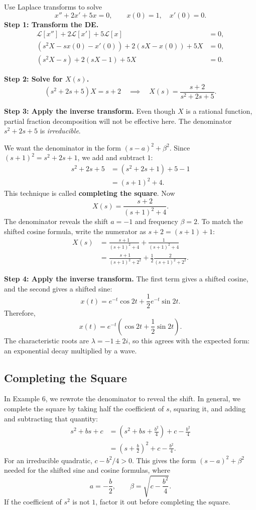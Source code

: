 \documentclass[10pt,letterpaper]{article}
\begin{document}
\begin{example}[6]{
Use Laplace transforms to solve
\[
x''+2x'+5x=0,\qquad x(0)=1,\quad x'(0)=0.
\]
}
\textbf{Step 1: Transform the DE.}
\begin{align*}
\mathcal{L}[x'']+2\mathcal{L}[x']+5\mathcal{L}[x]&=0,\\
(s^2X-sx(0)-x'(0))+2(sX-x(0))+5X&=0,\\
(s^2X-s)+2(sX-1)+5X&=0.
\end{align*}

\textbf{Step 2: Solve for $X(s)$.}
\[
(s^2+2s+5)X=s+2
\quad\implies\quad
X(s)=\frac{s+2}{s^2+2s+5}.
\]

\textbf{Step 3: Apply the inverse transform.}
Even though $X$ is a rational function, partial fraction decomposition will not be effective here. The denominator $s^2+2s+5$ is \textit{irreducible}. 

We want the denominator in the form $(s-a)^2+\beta^2$.
Since $(s+1)^2=s^2+2s+1$, we add and subtract $1$:
\begin{align*}
s^2+2s+5
&=(s^2+2s+1)+5-1\\
&=(s+1)^2+4.
\end{align*}
This technique is called \textbf{completing the square}.
Now
\[
X(s)=\frac{s+2}{(s+1)^2+4}.
\]
The denominator reveals the shift $a=-1$ and frequency
$\beta=2$. To match the shifted cosine formula,
write the numerator as $s+2=(s+1)+1$:
\begin{align*}
X(s)
&=\frac{s+1}{(s+1)^2+4}
+\frac{1}{(s+1)^2+4}\\
&=\frac{s+1}{(s+1)^2+2^2}
+\frac12\frac{2}{(s+1)^2+2^2}.
\end{align*}

\textbf{Step 4: Apply the inverse transform.}
The first term gives a shifted cosine, and the second
gives a shifted sine:
\[
x(t)=e^{-t}\cos2t+\frac12e^{-t}\sin2t.
\]
Therefore,
\[
\boxed{
x(t)=e^{-t}\left(\cos2t+\frac12\sin2t\right).
}
\]
The characteristic roots are $\lambda=-1\pm2i$,
so this agrees with the expected form:
an exponential decay multiplied by a wave.
\end{example}


\subsection{Completing the Square}

In Example 6, we rewrote the denominator to reveal
the shift. In general, we complete the square by
taking half the coefficient of $s$, squaring it,
and adding and subtracting that quantity:
\begin{align*}
s^2+bs+c
&=\left(s^2+bs+\frac{b^2}{4}\right)
+c-\frac{b^2}{4}\\
&=\boxed{\left(s+\frac{b}{2}\right)^2
+c-\frac{b^2}{4}.}
\end{align*}
For an irreducible quadratic, $c-b^2/4>0$.
This gives the form $(s-a)^2+\beta^2$ needed for
the shifted sine and cosine formulas, where
\[
a=-\frac{b}{2},
\qquad
\beta=\sqrt{c-\frac{b^2}{4}}.
\]
If the coefficient of $s^2$ is not $1$, factor it
out before completing the square.
\end{document}
